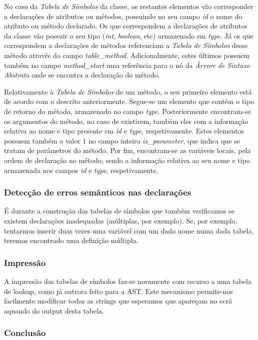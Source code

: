 \documentclass[11pt,a4paper]{article}
\begin{document}
	No caso da \emph{Tabela de Símbolos} da classe, os restantes elementos vão corresponder a declarações de atributos ou métodos, possuindo no seu campo \emph{id} o nome do atributo ou método declarado. Os que correspondem a declarações de atributos da classe vão possuir o seu tipo (\emph{int}, \emph{boolean}, etc) armazenado em \emph{type}. Já os que correspondem a declarações de métodos referenciam a \emph{Tabela de Símbolos} desse método através do campo  \emph{table\_method}. Adicionalmente, estes últimos possuem também no campo \emph{method\_start} uma referência para o nó da \emph{Árvore de Sintaxe Abstrata} onde se encontra a declaração do método.
	
	Relativamente à \emph{Tabela de Símbolos} de um método, o seu primeiro elemento está de acordo com o descrito anteriormente. Segue-se um elemento que contém o tipo de retorno do método, armazenado no campo \emph{type}. Posteriormente encontram-se os argumentos do método, no caso de existirem, também eles com a informação relativa ao nome e tipo presente em \emph{id} e \emph{type}, respetivamente. Estes elementos possuem também o valor $1$ no campo inteiro \emph{is\_parameter}, que indica que se tratam de parâmetros do método. Por fim, encontram-se as variáveis locais, pela ordem de declaração no método, sendo a informação relativa ao seu nome e tipo armazenada nos campos \emph{id} e \emph{type}, respetivamente.

	\subsubsection{Detecção de erros semânticos nas declarações}
	É durante a construção das tabelas de símbolos que também verificamos se existem declarações inadequadas (múltiplas, por exemplo). Se, por exemplo, tentarmos inserir duas vezes uma variável com um dado nome numa dada tabela, teremos encontrado uma definição múltipla.

	\subsubsection{Impressão}
	A impressão das tabelas de símbolos faz-se novamente com recurso a uma tabela de lookup, como já outrora feito para a AST. Este mecanismo permite-nos facilmente modificar todas as strings que esperamos que apareçam no ecrã aquando do output desta tabela.
	
	\subsubsection{Conclusão}
	
\end{document}

